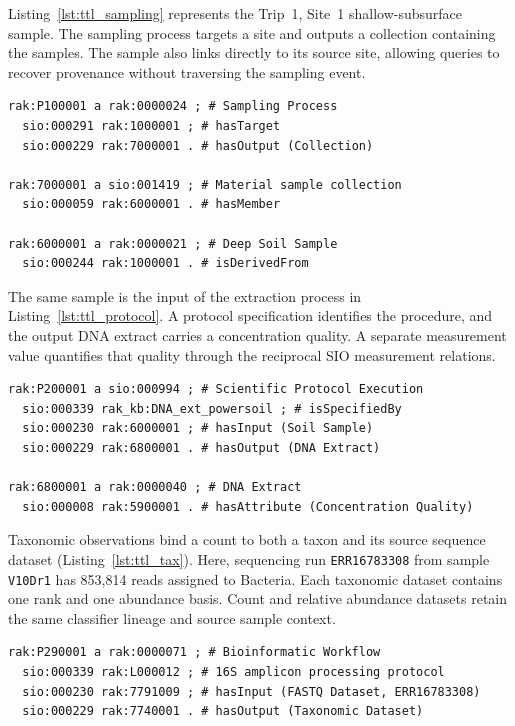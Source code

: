 \begin{revision}
Listing~\ref{lst:ttl_sampling} represents the Trip~1, Site~1
shallow-subsurface sample. The sampling process targets a site and
outputs a collection containing the samples. The sample also links
directly to its source site, allowing queries to recover provenance without traversing the sampling event.

\begin{lstlisting}[caption={Turtle representation of a sampling process.}, label={lst:ttl_sampling}, basicstyle=\ttfamily\scriptsize, frame=single]
rak:P100001 a rak:0000024 ; # Sampling Process
  sio:000291 rak:1000001 ; # hasTarget
  sio:000229 rak:7000001 . # hasOutput (Collection)

rak:7000001 a sio:001419 ; # Material sample collection
  sio:000059 rak:6000001 . # hasMember

rak:6000001 a rak:0000021 ; # Deep Soil Sample
  sio:000244 rak:1000001 . # isDerivedFrom
\end{lstlisting}

The same sample is the input of the extraction process in
Listing~\ref{lst:ttl_protocol}. A protocol specification identifies the
procedure, and the output DNA extract carries a concentration quality.
A separate measurement value quantifies that quality through the
reciprocal SIO measurement relations.

\begin{lstlisting}[caption={Turtle representation of a DNA extraction protocol.}, label={lst:ttl_protocol}, basicstyle=\ttfamily\scriptsize, frame=single]
rak:P200001 a sio:000994 ; # Scientific Protocol Execution
  sio:000339 rak_kb:DNA_ext_powersoil ; # isSpecifiedBy
  sio:000230 rak:6000001 ; # hasInput (Soil Sample)
  sio:000229 rak:6800001 . # hasOutput (DNA Extract)

rak:6800001 a rak:0000040 ; # DNA Extract
  sio:000008 rak:5900001 . # hasAttribute (Concentration Quality)
\end{lstlisting}

Taxonomic observations bind a count to both a taxon and its source
sequence dataset (Listing~\ref{lst:ttl_tax}). Here, sequencing run
\texttt{ERR16783308} from sample \texttt{V10Dr1} has 853,814 reads
assigned to Bacteria. Each taxonomic dataset contains one rank and
one abundance basis. Count and relative abundance datasets retain the
same classifier lineage and source sample context.

\begin{lstlisting}[caption={Turtle representation of taxonomic abundance formalized from a feature table.}, label={lst:ttl_tax}, basicstyle=\ttfamily\scriptsize, frame=single]
rak:P290001 a rak:0000071 ; # Bioinformatic Workflow
  sio:000339 rak:L000012 ; # 16S amplicon processing protocol
  sio:000230 rak:7791009 ; # hasInput (FASTQ Dataset, ERR16783308)
  sio:000229 rak:7740001 . # hasOutput (Taxonomic Dataset)


\end{lstlisting}
\end{revision}
